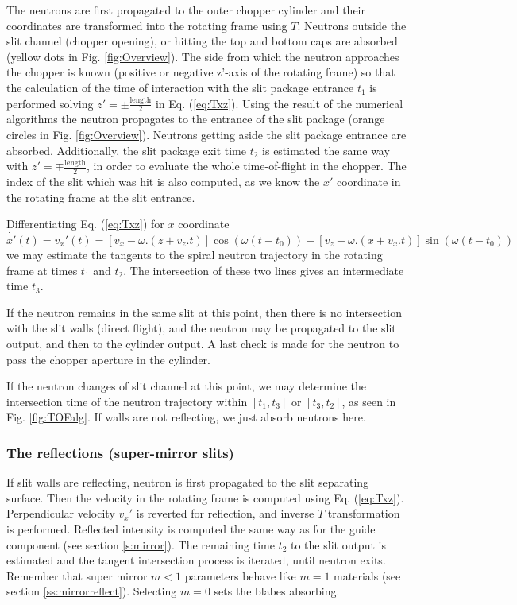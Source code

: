 The neutrons are first propagated to the outer chopper cylinder and their coordinates are transformed into the rotating frame using $T$. Neutrons outside the slit channel (chopper opening), or hitting the top and bottom caps are absorbed (yellow dots in Fig. \ref{fig:Overview}). The side from which the neutron approaches the chopper is known (positive or negative z'-axis of the rotating frame) so that the calculation of the time of interaction with the slit package entrance $t_1$ is performed solving $z' = \pm \frac{\textrm{length}}{2}$ in Eq. (\ref{eq:Txz}). Using the result of the numerical algorithms the neutron propagates to the entrance of the slit package (orange circles in Fig. \ref{fig:Overview}). Neutrons getting aside the slit package entrance are absorbed. Additionally, the slit package exit time $t_2$ is estimated the same way with $z' = \mp \frac{\textrm{length}}{2}$, in order to evaluate the whole time-of-flight in the chopper. The index of the slit which was hit is also computed, as we know the $x'$ coordinate in the rotating frame at the slit entrance.

Differentiating Eq. (\ref{eq:Txz}) for $x$ coordinate
\begin{equation}
\dot{x'}(t) = v_x'(t) = [v_x-\omega.(z+v_z.t)]\cos(\omega(t-t_0)) - [v_z+\omega.(x+v_x.t)]\sin(\omega(t-t_0))
\end{equation}
we may estimate the tangents to the spiral neutron trajectory in the rotating frame at times $t_1$ and $t_2$. The intersection of these two lines gives an intermediate time $t_3$.

If the neutron remains in the same slit at this point, then there is no intersection with the slit walls (direct flight), and the neutron may be propagated to the slit output, and then to the cylinder output. A last check is made for the neutron to pass the chopper aperture in the cylinder.

If the neutron changes of slit channel at this point, we may determine the intersection time of the neutron trajectory within $[ t_1, t_3 ]$ or $[ t_3, t_2 ]$, as seen in Fig. \ref{fig:TOFalg}. If walls are not reflecting, we just absorb neutrons here.

\subsubsection{The reflections (super-mirror slits)}

If slit walls are reflecting, neutron is first propagated to the slit separating surface. Then the velocity in the rotating frame is computed using Eq. (\ref{eq:Txz}). Perpendicular velocity $v_x'$ is reverted for reflection, and inverse $T$ transformation is performed. Reflected intensity is computed the same way as for the guide component (see section \ref{s:mirror}). The remaining time $t_2$ to the slit output is estimated and the tangent intersection process is iterated, until neutron exits. Remember that super mirror $m < 1$ parameters behave like $m=1$ materials (see section \ref{ss:mirrorreflect}). Selecting $m=0$ sets the blabes absorbing.


